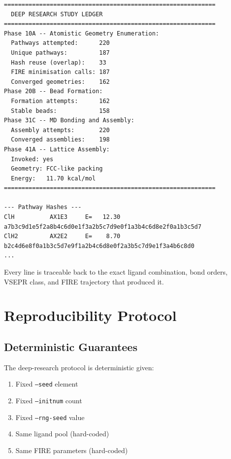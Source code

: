 \documentclass[11pt,a4paper]{article}
\begin{document}
\begin{lstlisting}[title={\textbf{Sample ledger output}}]
============================================================
  DEEP RESEARCH STUDY LEDGER
============================================================
Phase 10A -- Atomistic Geometry Enumeration:
  Pathways attempted:      220
  Unique pathways:         187
  Hash reuse (overlap):    33
  FIRE minimisation calls: 187
  Converged geometries:    162
Phase 20B -- Bead Formation:
  Formation attempts:      162
  Stable beads:            158
Phase 31C -- MD Bonding and Assembly:
  Assembly attempts:       220
  Converged assemblies:    198
Phase 41A -- Lattice Assembly:
  Invoked: yes
  Geometry: FCC-like packing
  Energy:   11.70 kcal/mol
============================================================

--- Pathway Hashes ---
ClH          AX1E3     E=   12.30  a7b3c9d1e5f2a8b4c6d0e1f3a2b5c7d9e0f1a3b4c6d8e2f0a1b3c5d7
ClH2         AX2E2     E=    8.70  b2c4d6e8f0a1b3c5d7e9f1a2b4c6d8e0f2a3b5c7d9e1f3a4b6c8d0
...
\end{lstlisting}

\noindent Every line is traceable back to the exact ligand combination,
bond orders, VSEPR class, and FIRE trajectory that produced it.

\section{Reproducibility Protocol}
\label{sec:reproducibility}

\subsection{Deterministic Guarantees}

The deep-research protocol is deterministic given:

\begin{enumerate}
  \item Fixed \texttt{--seed} element
  \item Fixed \texttt{--initnum} count
  \item Fixed \texttt{--rng-seed} value
  \item Same ligand pool (hard-coded)
  \item Same FIRE parameters (hard-coded)
\end{enumerate}
\end{document}
